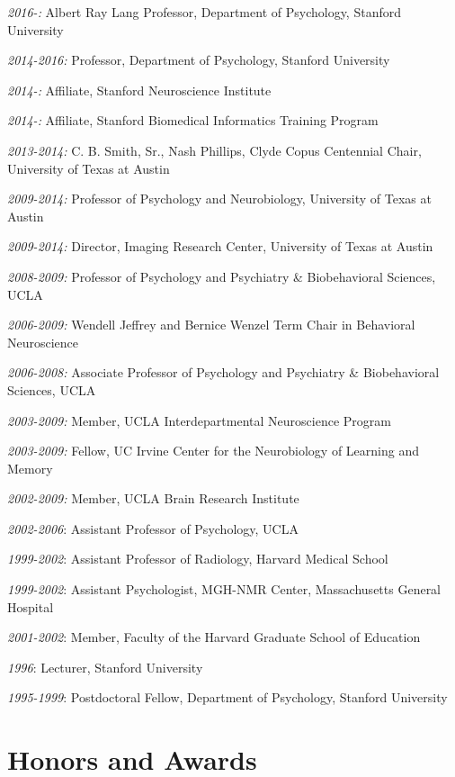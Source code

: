 \documentclass[10pt, letterpaper]{article}
\begin{document}
\textit{2016-:} Albert Ray Lang Professor, Department of Psychology, Stanford University

\textit{2014-2016:} Professor, Department of Psychology, Stanford University

\textit{2014-:} Affiliate, Stanford Neuroscience Institute

\textit{2014-:} Affiliate, Stanford Biomedical Informatics Training Program

\textit{2013-2014:} C. B. Smith, Sr., Nash Phillips, Clyde Copus Centennial Chair, University of Texas at Austin

\textit{2009-2014:} Professor of Psychology and Neurobiology, University of Texas at Austin

\textit{2009-2014:} Director, Imaging Research Center, University of Texas at Austin

\textit{2008-2009:} Professor of Psychology and Psychiatry \& Biobehavioral Sciences, UCLA

\textit{2006-2009:} Wendell Jeffrey and Bernice Wenzel Term Chair in Behavioral Neuroscience

\textit{2006-2008:} Associate Professor of Psychology and Psychiatry \& Biobehavioral Sciences, UCLA

\textit{2003-2009:} Member, UCLA Interdepartmental Neuroscience Program

\textit{2003-2009:} Fellow, UC Irvine Center for the Neurobiology of Learning and Memory

\textit{2002-2009:} Member, UCLA Brain Research Institute

\textit{2002-2006}: Assistant Professor of Psychology, UCLA

\textit{1999-2002}: Assistant Professor of Radiology, Harvard Medical School

\textit{1999-2002}: Assistant Psychologist, MGH-NMR Center, Massachusetts General Hospital

\textit{2001-2002}: Member, Faculty of the Harvard Graduate School of Education

\textit{1996}: Lecturer, Stanford University

\textit{1995-1999}: Postdoctoral Fellow, Department of Psychology, Stanford University



\section*{Honors and Awards}
\noindent
\end{document}
